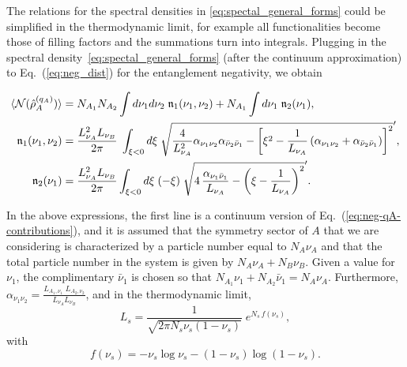 \documentclass[aps,pra,reprint,superscriptaddress,twocolumn,notitlepage]{revtex4-1}
\numberwithin{equation}{section}
\begin{document}
The relations for the spectral densities in \eqref{eq:spectal_general_forms} could be simplified in the thermodynamic limit, for example all functionalities become those of filling factors and the summations turn into integrals. Plugging in the spectral density~\eqref{eq:spectal_general_forms} (after the continuum approximation) to Eq.~(\ref{eq:neg_dist}) for the entanglement negativity, we obtain
\begin{widetext}
\begin{align}
    \label{eq:neg-u1-decomp}
    \braket{\mathcal{N}(\hat\rho_A^{(q_A)})} 
    &= N_{A_1} N_{A_2} \int d\nu_1 d\nu_2 \; \mathfrak{n}_{1}(\nu_1,\nu_2) + N_{A_1} \int d\nu_1 \; \mathfrak{n}_{2}(\nu_1), \\
    \label{eq:negativity_saddle}
    \mathfrak{n}_{1}(\nu_1,\nu_2) & =  \frac{L_{\nu_A}^2 L_{\nu_B} }{2\pi} \; \int_{\xi<0} d\xi \;  \sqrt{ \frac{4}{L_{\nu_A}^2}  \alpha_{\nu_1 \nu_2}  \alpha_{\bar{\nu}_2 \bar{\nu}_1}  - \left[ \xi^2  - \frac{1}{L_{\nu_A}}  \left(  \alpha_{\nu_1 \nu_2} + \alpha_{\bar{\nu}_2 \bar{\nu}_1} \right) \right]^2  }', \nonumber \\
    \mathfrak{n}_{2}(\nu_1) & =   \frac{L_{\nu_A}^2 L_{\nu_B} }{2\pi} \int_{\xi<0} d\xi \; (-\xi) \; \sqrt{4 \, \frac{\alpha_{\nu_1 \bar{\nu}_1} }{L_{\nu_A}}  - \left( \xi - \frac1{L_{\nu_A}}  \right)^2 }' .
\end{align}
\end{widetext}
In the above expressions, the first line is a continuum version of Eq.~(\ref{eq:neg-qA-contributions}), and it is assumed that the symmetry sector of $A$ that we are considering is characterized by a particle number equal to $N_A \nu_A$ and that the total particle number in the system is given by $N_A \nu_A + N_B \nu_B$. Given a value for $\nu_1$, the complimentary $\bar{\nu}_1$ is chosen so that $N_{A_1}\nu_1 + N_{A_2}\bar{\nu}_1 = N_{A} \nu_A$. Furthermore, $\alpha_{\nu_1 \nu_2} = \frac{L_{A_1,\nu_1} \; L_{A_2,\nu_2}}{ L_{\nu_A} L_{\nu_B} }$, and in the thermodynamic limit, 
\begin{equation}
    L_s = \frac{1}{\sqrt{2\pi N_s \nu_s \left( 1 - \nu_s \right)  }} \; e^{N_s \, f(\nu_s)},
\end{equation}
with 
\begin{equation} \label{eq:definition_f}
f(\nu_s) = -\nu_s \log\nu_s - (1-\nu_s) \log\left( 1 - \nu_s \right).
\end{equation}
\end{document}
